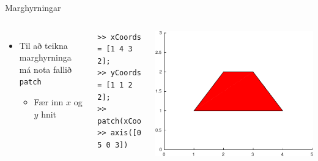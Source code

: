 \documentclass[handout]{beamer}
\begin{document}
\begin{frame}[fragile]{Marghyrningar}
\begin{columns}
\begin{itemize}
 \item Til að teikna marghyrninga má nota fallið \texttt{patch}
 \begin{itemize}
  \item Fær inn $x$ og $y$ hnit
 \end{itemize}
\end{itemize}
\begin{verbatim}
>> xCoords = [1 4 3 2];
>> yCoords = [1 1 2 2];
>> patch(xCoords,yCoords,'r')
>> axis([0 5 0 3])
\end{verbatim}
\includegraphics[width=\textwidth]{Pics/patch-example}
\end{columns}
\end{frame}
\end{document}
